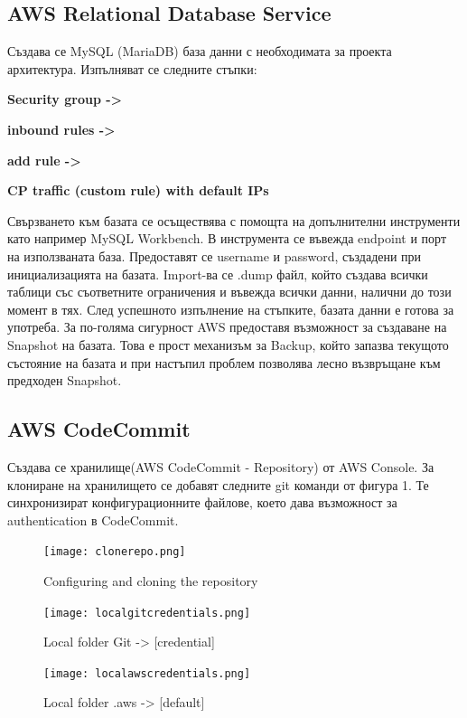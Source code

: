 \documentclass[12pt]{article}
\begin{document}
\subsection{AWS Relational Database Service}
\noindent Създава се MySQL (MariaDB) база данни с необходимата за проекта архитектура. Изпълняват се следните стъпки:
\medskip

\noindent \textbf{Security group ->}

\noindent \textbf{inbound rules ->}

\noindent \textbf{add rule ->}

\noindent \textbf{CP traffic (custom rule) with default IPs}
\medskip

\noindent Свързването към базата се осъществява с помощта на допълнителни инструменти като например MySQL Workbench. В инструмента се въвежда endpoint и порт на използваната база. Предоставят се username и password, създадени при инициализацията на базата. Import-ва се .dump файл, който създава всички таблици със съответните ограничения и въвежда всички данни, налични до този момент в тях. След успешното изпълнение на стъпките, базата данни е готова за употреба. За по-голяма сигурност AWS предоставя възможност за създаване на Snapshot на базата. Това е прост механизъм за Backup, който запазва текущото състояние на базата и при настъпил проблем позволява лесно възвръщане към предходен Snapshot.
\medskip

\subsection{AWS CodeCommit}
\noindent Създава се хранилище(AWS CodeCommit - Repository) от AWS Console. За клониране на хранилището се добавят следните git команди от фигура 1. Те синхронизират конфигурационните файлове, което дава възможност за authentication в CodeCommit. 
\medskip

\begin{figure}[h!]
\centering
    \texttt{[image: clonerepo.png]}
  \caption{Configuring and cloning the repository}
\end{figure}

\begin{figure}[h!]
\centering
    \texttt{[image: localgitcredentials.png]}
  \caption{Local folder Git -> [credential]}
\end{figure}

\begin{figure}[h!]
\centering
    \texttt{[image: localawscredentials.png]}
  \caption{Local folder .aws -> [default]}
\end{figure}
\end{document}
